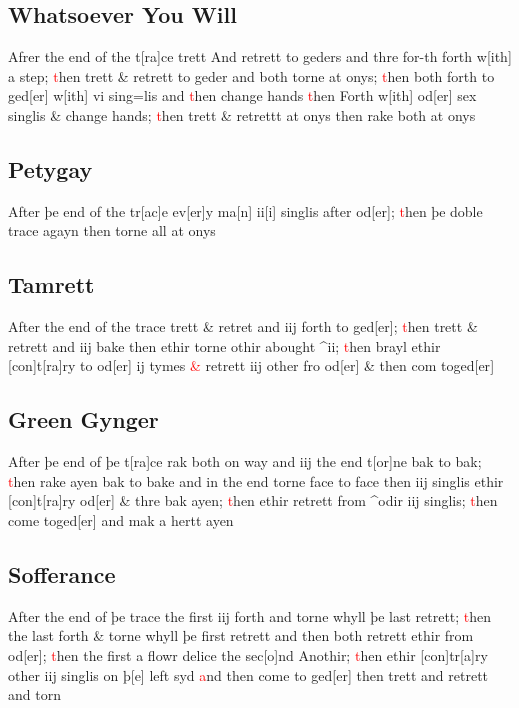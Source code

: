 \documentclass[12pt,letter]{article} %
\newcommand{\red}[1]{\textcolor{red}{#1}}
\newcommand{\srcpg}[1]{
    \noindent{
        \color{Gray}{\rule[0.5ex]{\linewidth}{1pt}~#1} 
        \\
    }
}
\begin{document}
\subsection{Whatsoever You Will}
Afrer the end of the t{[}ra{]}ce trett \srcpg{62} And retrett to geders
and thre for-th forth w{[}ith{]} a step; \red{t}hen trett \& retrett to geder
and both torne at onys; \red{t}hen both forth to ged{[}er{]} w{[}ith{]} vi
sing=lis and \red{t}hen change hands \red{t}hen Forth w{[}ith{]} od{[}er{]} sex
singlis \& change hands; \red{t}hen trett \& retrettt at onys then rake both
at onys

\subsection{Petygay}
After þe end of the tr{[}ac{]}e ev{[}er{]}y ma{[}n{]} ii{[}i{]} singlis
after od{[}er{]}; \red{t}hen þe doble trace agayn then torne all at onys

\subsection{Tamrett}
After the end of the trace trett \& retret and iij forth to ged{[}er{]};
\red{t}hen trett \& retrett and iij bake then ethir torne othir abought
\^{}ii; \red{t}hen brayl ethir {[}con{]}t{[}ra{]}ry to od{[}er{]} ij tymes \red{\&}
retrett iij other fro od{[}er{]} \& then com toged{[}er{]}

\subsection{Green Gynger}
After þe end of þe t{[}ra{]}ce rak both \srcpg{63} on way and iij the
end t{[}or{]}ne bak to bak; \red{t}hen rake ayen bak to bake and in the end
torne face to face then iij singlis ethir {[}con{]}t{[}ra{]}ry
od{[}er{]} \& thre bak ayen; \red{t}hen ethir retrett from \^{}odir iij
singlis; \red{t}hen come toged{[}er{]} and mak a hertt ayen

\subsection{Sofferance}
After the end of þe trace the first iij forth and torne whyll þe last
retrett; \red{t}hen the last forth \& torne whyll þe first retrett and then 
both retrett ethir from od{[}er{]}; \red{t}hen the first a flowr delice the
sec{[}o{]}nd Anothir; \red{t}hen ethir {[}con{]}tr{[}a{]}ry other iij singlis
on þ{[}e{]} left syd \red{a}nd then come to ged{[}er{]} then trett and retrett
and torn
\end{document}
